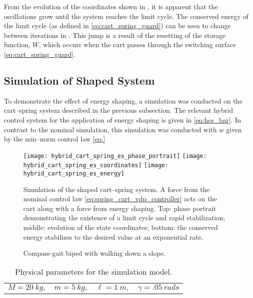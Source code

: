 From the evolution of the coordinates shown in
, it is apparent that the
oscillations grow until the system reaches the limit cycle.
%
The conserved energy of the limit cycle (as defined in
\eqref{eq:cart_spring_guard}) can be seen to change between iterations in .
%
This jump is a result of the resetting of the storage function, $W$, which
occurs when the cart passes through the switching surface
\eqref{eq:cart_spring_guard}.

\subsection{Simulation of Shaped System}

To demonstrate the effect of energy shaping, a simulation was conducted on the
cart--spring system described in the previous subsection.
%
The relevant hybrid control system for the application of energy shaping is
given in \eqref{eq:hcs_bar}.
%
In contrast to the nominal simulation, this simulation was conducted with $w$
given by the min--norm control law \eqref{eq:}

\begin{figure*}[htp!]
  \centering
  \texttt{[image: hybrid\_cart\_spring\_es\_phase\_portrait]}
  \texttt{[image: hybrid\_cart\_spring\_es\_coordinates]}
  \texttt{[image: hybrid\_cart\_spring\_es\_energy]}
  \caption[Simulation of the shaped cart--spring system.]{Simulation of the
    shaped cart--spring system.
    A force from the nominal control law \eqref{eq:spring_cart_vdp_controller}
    acts on the cart along with a force from energy shaping.
    Top: phase portrait demonstrating the existence of a limit cycle and rapid
    stabilization;
    middle: evolution of the state coordinates;
    bottom: the conserved energy stabilizes to the desired value at an
    exponential rate.}
  \label{fig:cart_spring_simulation_shaped}
\end{figure*}


\begin{figure}
  \centering
  \def\svgwidth{0.5\columnwidth}
  
  \caption{Compass-gait biped with walking down a slope.}
  \label{fig:simulation-model}
  \vspace{-1em}
\end{figure}
% 
\begin{table}[t]
  \caption{Physical parameters for the simulation model.}
  \label{tab:mparam}
  \centering
  \begin{tabular}{c c c c}
    $M =20 \ \mathit{kg},$ &
    $m = 5 \ \mathit{kg},$ &
    $\ell = 1 \ \mathit{m},$ &
    $\gamma = .05 \ \mathit{rads}$
  \end{tabular}
  \vspace{-1em}
\end{table}

